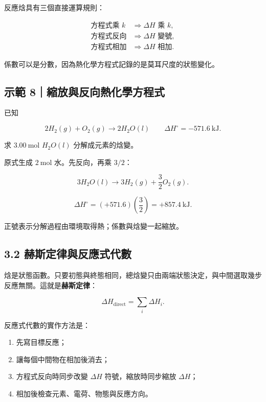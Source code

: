 \documentclass[11pt,a4paper]{article}
\providecommand{\tightlist}{%
  \setlength{\itemsep}{0pt}\setlength{\parskip}{0pt}}
\begin{document}
反應焓具有三個直接運算規則：

\[
\begin{aligned}
\text{方程式乘 }k&\Rightarrow \Delta H\text{ 乘 }k,\\
\text{方程式反向}&\Rightarrow \Delta H\text{ 變號},\\
\text{方程式相加}&\Rightarrow \Delta H\text{ 相加}.
\end{aligned}
\]

係數可以是分數，因為熱化學方程式記錄的是莫耳尺度的狀態變化。

\begin{HandoutWorkedExample}

\subsection{示範 8｜縮放與反向熱化學方程式}\label{ux793aux7bc4-8ux7e2eux653eux8207ux53cdux5411ux71b1ux5316ux5b78ux65b9ux7a0bux5f0f}

已知

\[
2H_2(g)+O_2(g)\rightarrow2H_2O(l)
\qquad \Delta H^\circ=-571.6\ \mathrm{kJ}.
\]

求 \(3.00\ \mathrm{mol}\) \(H_2O(l)\) 分解成元素的焓變。

原式生成 \(2\ \mathrm{mol}\) 水。先反向，再乘 \(3/2\)：

\[
3H_2O(l)\rightarrow3H_2(g)+\frac32O_2(g).
\]

\[
\Delta H^\circ=(+571.6)\left(\frac32\right)=+857.4\ \mathrm{kJ}.
\]

正號表示分解過程由環境取得熱；係數與焓變一起縮放。

\end{HandoutWorkedExample}

\subsection{3.2 赫斯定律與反應式代數}\label{ux8d6bux65afux5b9aux5f8bux8207ux53cdux61c9ux5f0fux4ee3ux6578}

焓是狀態函數。只要初態與終態相同，總焓變只由兩端狀態決定，與中間選取幾步反應無關。這就是\textbf{赫斯定律}：

\[
\Delta H_{\text{direct}}=\sum_i \Delta H_i.
\]

反應式代數的實作方法是：

\begin{enumerate}
\def\labelenumi{\arabic{enumi}.}
\tightlist
\item
  先寫目標反應；
\item
  讓每個中間物在相加後消去；
\item
  方程式反向時同步改變 \(\Delta H\) 符號，縮放時同步縮放 \(\Delta H\)；
\item
  相加後檢查元素、電荷、物態與反應方向。
\end{enumerate}
\end{document}
